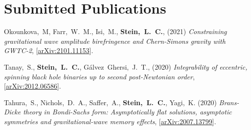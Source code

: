 \newcommand{\arxiv}[1]{[\href{http://arxiv.org/abs/#1}{arXiv:#1}]}
\newcommand{\citeCount}[1]{(#1 citations)}
\renewcommand{\citeCount}[1]{}


\setcounter{numPubs}{44}
\setcounter{pubCounter}{\value{numPubs}}


\section{\sc Submitted Publications}
\begin{etaremune}[start=\value{pubCounter}]
\item
  Okounkova,~M,
  Farr,~W.~M.,
  Isi,~M.,
  {\bf Stein,~L.~C.},
  (2021)
  {\it Constraining gravitational wave amplitude birefringence and Chern-Simons gravity with GWTC-2},
  \arxiv{2101.11153}.
  \citeCount{0}
\item
  Tanay,~S.,
  {\bf Stein,~L.~C.},
  Gálvez~Ghersi,~J.~T.,
  (2020)
  {\it Integrability of eccentric, spinning black hole binaries up to second post-Newtonian order},
  \arxiv{2012.06586}.
  \citeCount{0}
\item
  Tahura,~S.,
  Nichols,~D.~A.,
  Saffer,~A.,
  {\bf Stein,~L.~C.},
  Yagi,~K.
  (2020)
  {\it Brans-Dicke theory in Bondi-Sachs form: Asymptotically flat solutions, asymptotic symmetries and gravitational-wave memory effects},
  \arxiv{2007.13799}.
  \citeCount{0}
  \setcounter{pubCounter}{\value{enumi}}
\end{etaremune}


